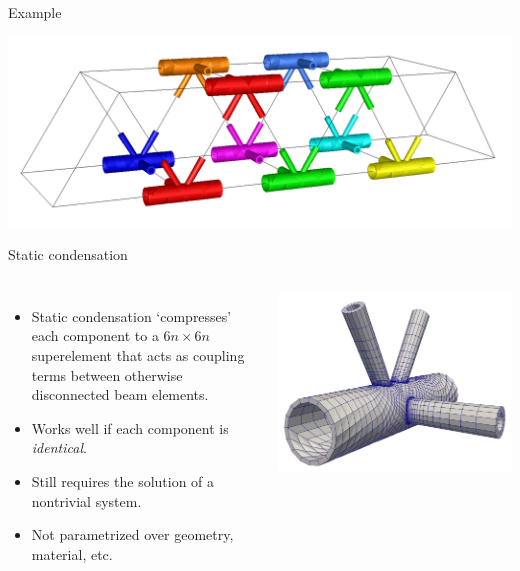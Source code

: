 \documentclass{sintefbeamer}
\begin{document}
\begin{frame}{Example}
    \begin{center}
        \includegraphics[width=1.0\textwidth,trim={0 0 0 0},clip]{images/ebridge-before.png}
    \end{center}
\end{frame}

\begin{frame}{Static condensation}
    \begin{columns}
        \begin{itemize}
            \item Static condensation `compresses' each component to a \(6n \times 6n\) superelement that acts as coupling terms between otherwise disconnected beam elements.
            \item Works well if each component is \emph{identical}.
            \item Still requires the solution of a nontrivial system.
            \item Not parametrized over geometry, material, etc.
        \end{itemize}
        \includegraphics[height=0.4\textheight,trim={0 0 0 0},clip]{images/kjoint.png}
    \end{columns}
\end{frame}
\end{document}
